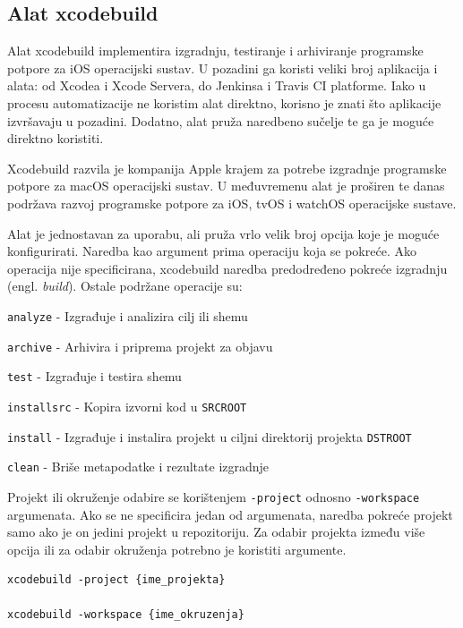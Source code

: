 \documentclass[times, utf8, diplomski, numeric]{fer}
\newcommand{\eng}[1]{(engl. \textit{#1})}
\begin{document}
\begin{appendices}

\chapter{Alat xcodebuild} \label{header:xcodebuild}

Alat xcodebuild implementira izgradnju, testiranje i arhiviranje programske potpore za iOS operacijski sustav. U pozadini ga koristi veliki broj aplikacija i alata: od Xcodea i Xcode Servera, do Jenkinsa i Travis CI platforme. Iako u procesu automatizacije ne koristim alat direktno, korisno je znati što aplikacije izvršavaju u pozadini. Dodatno, alat pruža naredbeno sučelje te ga je moguće direktno koristiti.

Xcodebuild razvila je kompanija Apple krajem za potrebe izgradnje programske potpore za macOS operacijski sustav. U međuvremenu alat je proširen te danas podržava razvoj programske potpore za iOS, tvOS i watchOS operacijske sustave.

Alat je jednostavan za uporabu, ali pruža vrlo velik broj opcija koje je moguće konfigurirati. Naredba kao argument prima operaciju koja se pokreće. Ako operacija nije specificirana, xcodebuild naredba predodređeno pokreće izgradnju \eng{build}. Ostale podržane operacije su:

\verb|analyze| - Izgrađuje i analizira cilj ili shemu

\verb|archive| - Arhivira i priprema projekt za objavu

\verb|test| - Izgrađuje i testira shemu

\verb|installsrc| - Kopira izvorni kod u \verb|SRCROOT|

\verb|install| - Izgrađuje i instalira projekt u ciljni direktorij projekta \verb|DSTROOT|

\verb|clean| - Briše metapodatke i rezultate izgradnje

Projekt ili okruženje odabire se korištenjem \verb|-project| odnosno \verb|-workspace| argumenata. Ako se ne specificira jedan od argumenata, naredba pokreće projekt samo ako je on jedini projekt u repozitoriju. Za odabir projekta između više opcija ili za odabir okruženja potrebno je koristiti argumente.

\begin{lstlisting}[caption=Odabir projekta i okruženja za obavljanje operacije]
xcodebuild -project {ime_projekta}

xcodebuild -workspace {ime_okruzenja}
\end{lstlisting}


\end{appendices}
\end{document}
